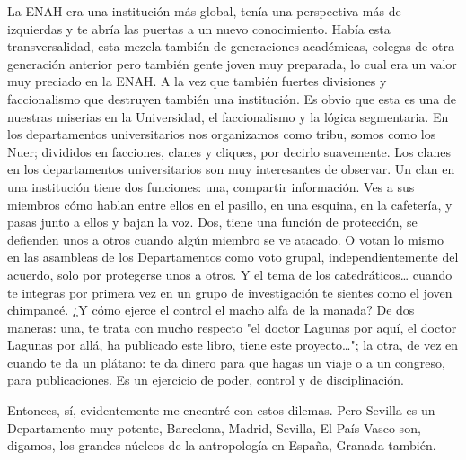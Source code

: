 \documentclass[
  spanish,
  11pt,
  a4paper,
]{scrbook}
\newenvironment{transcripcion}{
    \begin{list}{}{
        \setlength{\leftmargin}{1.5em}  %
        \setlength{\rightmargin}{0em}
        \setlength{\itemsep}{0.2em}     %
        \setlength{\parsep}{0.0em}
        \setlength{\listparindent}{0pt}
    }
}{
    \end{list}
}
\begin{document}
\begin{transcripcion}
La ENAH era una institución más global, tenía una perspectiva más de izquierdas y te abría las puertas a un nuevo conocimiento. Había esta transversalidad, esta mezcla también de generaciones académicas, colegas de otra generación anterior pero también gente joven muy preparada, lo cual era un valor muy preciado en la ENAH. A la vez que también fuertes divisiones y faccionalismo que destruyen también una institución. Es obvio que esta es una de nuestras miserias en la Universidad, el faccionalismo y la lógica segmentaria. En los departamentos universitarios nos organizamos como tribu, somos como los Nuer; divididos en facciones, clanes y cliques, por decirlo suavemente. Los clanes en los departamentos universitarios son muy interesantes de observar. Un clan en una institución tiene dos funciones: una, compartir información. Ves a sus miembros cómo hablan entre ellos en el pasillo, en una esquina, en la cafetería, y pasas junto a ellos y bajan la voz. Dos, tiene una función de protección, se defienden unos a otros cuando algún miembro se ve atacado. O votan lo mismo en las asambleas de los Departamentos como voto grupal, independientemente del acuerdo, solo por protegerse unos a otros. Y el tema de los catedráticos… cuando te integras por primera vez en un grupo de investigación te sientes como el joven chimpancé. ¿Y cómo ejerce el control el macho alfa de la manada? De dos maneras: una, te trata con mucho respecto "el doctor Lagunas por aquí, el doctor Lagunas por allá, ha publicado este libro, tiene este proyecto…"; la otra, de vez en cuando te da un plátano: te da dinero para que hagas un viaje o a un congreso, para publicaciones. Es un ejercicio de poder, control y de disciplinación. 

Entonces, sí, evidentemente me encontré con estos dilemas. Pero Sevilla es un Departamento muy potente, Barcelona, Madrid, Sevilla, El País Vasco son, digamos, los grandes núcleos de la antropología en España, Granada también.


\end{transcripcion}
\end{document}
